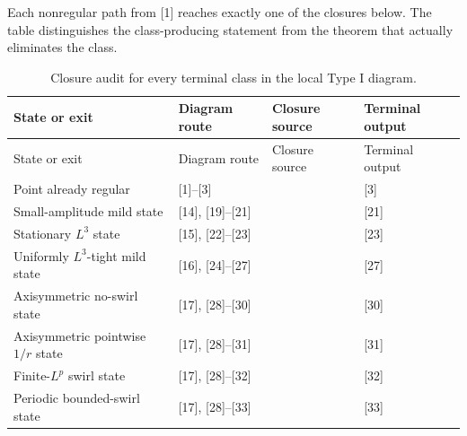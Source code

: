 \documentclass[11pt]{amsart}
\theoremstyle{plain}
\theoremstyle{definition}
\theoremstyle{remark}
\numberwithin{equation}{section}
\begin{document}
Each nonregular path from [1] reaches exactly one of the closures below.  The
table distinguishes the class-producing statement from the theorem that
actually eliminates the class.

\begin{landscape}
\begingroup
\small
\setlength{\tabcolsep}{3pt}
\renewcommand{\arraystretch}{1.15}
\begin{longtable}{@{}L{4.20cm}C{2.35cm}L{8.30cm}L{4.50cm}@{}}
\caption{Closure audit for every terminal class in the local Type I diagram.}
\label{tab:local-typeI-branch-closure-ledger}\\
\toprule
State or exit & Diagram route & Closure source & Terminal output \\
\midrule
\endfirsthead
\toprule
State or exit & Diagram route & Closure source & Terminal output \\
\midrule
\endhead
\bottomrule
\endfoot

Point already regular & [1]--[3] &
 & [3] \\

Small-amplitude mild state & [14], [19]--[21] &
 & [21] \\

Stationary \(L^3\) state & [15], [22]--[23] &
 & [23] \\

Uniformly \(L^3\)-tight mild state & [16], [24]--[27] &
 & [27] \\

Axisymmetric no-swirl state & [17], [28]--[30] &
 & [30] \\

Axisymmetric pointwise \(1/r\) state & [17], [28]--[31] &
 & [31] \\

Finite-\(L^p\) swirl state & [17], [28]--[32] &
 & [32] \\

Periodic bounded-swirl state & [17], [28]--[33] &
 & [33] \\


\end{longtable}
\end{landscape}
\end{document}
